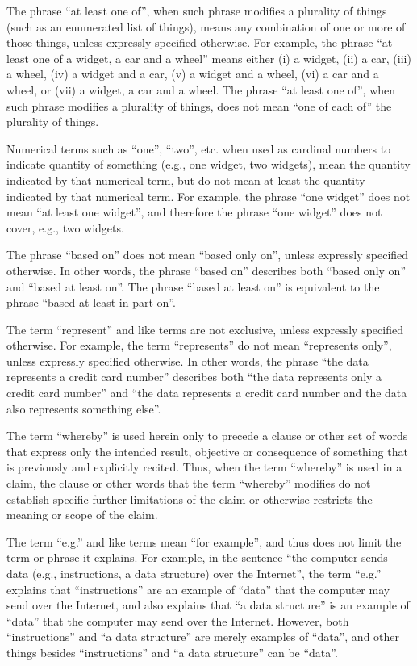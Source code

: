 \documentclass[11pt,a4paper]{article}
\begin{document}
The phrase “at least one of”, when such phrase modifies a plurality of things (such as an enumerated list of things), means any combination of one or more of those things, unless expressly specified otherwise. For example, the phrase “at least one of a widget, a car and a wheel” means either (i) a widget, (ii) a car, (iii) a wheel, (iv) a widget and a car, (v) a widget and a wheel, (vi) a car and a wheel, or (vii) a widget, a car and a wheel. The phrase “at least one of”, when such phrase modifies a plurality of things, does not mean “one of each of” the plurality of things.

Numerical terms such as “one”, “two”, etc. when used as cardinal numbers to indicate quantity of something (e.g., one widget, two widgets), mean the quantity indicated by that numerical term, but do not mean at least the quantity indicated by that numerical term. For example, the phrase “one widget” does not mean “at least one widget”, and therefore the phrase “one widget” does not cover, e.g., two widgets.

The phrase “based on” does not mean “based only on”, unless expressly specified otherwise. In other words, the phrase “based on” describes both “based only on” and “based at least on”. The phrase “based at least on” is equivalent to the phrase “based at least in part on”.

The term “represent” and like terms are not exclusive, unless expressly specified otherwise. For example, the term “represents” do not mean “represents only”, unless expressly specified otherwise. In other words, the phrase “the data represents a credit card number” describes both “the data represents only a credit card number” and “the data represents a credit card number and the data also represents something else”.

The term “whereby” is used herein only to precede a clause or other set of words that express only the intended result, objective or consequence of something that is previously and explicitly recited. Thus, when the term “whereby” is used in a claim, the clause or other words that the term “whereby” modifies do not establish specific further limitations of the claim or otherwise restricts the meaning or scope of the claim.

The term “e.g.” and like terms mean “for example”, and thus does not limit the term or phrase it explains. For example, in the sentence “the computer sends data (e.g., instructions, a data structure) over the Internet”, the term “e.g.” explains that “instructions” are an example of “data” that the computer may send over the Internet, and also explains that “a data structure” is an example of “data” that the computer may send over the Internet. However, both “instructions” and “a data structure” are merely examples of “data”, and other things besides “instructions” and “a data structure” can be “data”.
\end{document}
